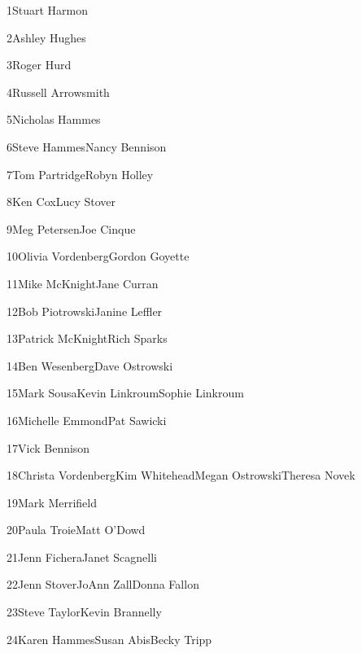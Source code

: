 \parbox[t]{4.75in}{1\hfil\break Stuart Harmon}\hfil\break\vskip 0.25in
\parbox[t]{4.75in}{2\hfil\break Ashley Hughes}\hfil\break\vskip 0.25in
\parbox[t]{4.75in}{3\hfil\break Roger Hurd}\hfil\break\vskip 0.25in
\parbox[t]{4.75in}{4\hfil\break Russell Arrowsmith}\hfil\break\vskip 0.25in
\parbox[t]{4.75in}{5\hfil\break Nicholas Hammes}\hfil\break\vskip 0.25in
\parbox[t]{4.75in}{6\hfil\break Steve Hammes\hfil\break Nancy Bennison}\hfil\break\vskip 0.25in
\parbox[t]{4.75in}{7\hfil\break Tom Partridge\hfil\break Robyn Holley}\hfil\break\vskip 0.25in
\parbox[t]{4.75in}{8\hfil\break Ken Cox\hfil\break Lucy Stover}\hfil\break\vskip 0.25in
\parbox[t]{4.75in}{9\hfil\break Meg Petersen\hfil\break Joe Cinque}\hfil\break\vskip 0.25in
\parbox[t]{4.75in}{10\hfil\break Olivia Vordenberg\hfil\break Gordon Goyette}\hfil\break\vskip 0.25in
\parbox[t]{4.75in}{11\hfil\break Mike McKnight\hfil\break Jane Curran}\hfil\break\vskip 0.25in
\parbox[t]{4.75in}{12\hfil\break Bob Piotrowski\hfil\break Janine Leffler}\hfil\break\vskip 0.25in
\parbox[t]{4.75in}{13\hfil\break Patrick McKnight\hfil\break Rich Sparks}\hfil\break\vskip 0.25in
\parbox[t]{4.75in}{14\hfil\break Ben Wesenberg\hfil\break Dave Ostrowski}\hfil\break\vskip 0.25in
\parbox[t]{4.75in}{15\hfil\break Mark Sousa\hfil\break Kevin Linkroum\hfil\break Sophie Linkroum}\hfil\break\vskip 0.25in
\parbox[t]{4.75in}{16\hfil\break Michelle Emmond\hfil\break Pat Sawicki}\hfil\break\vskip 0.25in
\parbox[t]{4.75in}{17\hfil\break Vick Bennison}\hfil\break\vskip 0.25in
\parbox[t]{4.75in}{18\hfil\break Christa Vordenberg\hfil\break Kim Whitehead\hfil\break Megan Ostrowski\hfil\break Theresa Novek}\hfil\break\vskip 0.25in
\parbox[t]{4.75in}{19\hfil\break Mark Merrifield}\hfil\break\vskip 0.25in
\parbox[t]{4.75in}{20\hfil\break Paula Troie\hfil\break Matt O'Dowd}\hfil\break\vskip 0.25in
\parbox[t]{4.75in}{21\hfil\break Jenn Fichera\hfil\break Janet Scagnelli}\hfil\break\vskip 0.25in
\parbox[t]{4.75in}{22\hfil\break Jenn Stover\hfil\break JoAnn Zall\hfil\break Donna Fallon}\hfil\break\vskip 0.25in
\parbox[t]{4.75in}{23\hfil\break Steve Taylor\hfil\break Kevin Brannelly}\hfil\break\vskip 0.25in
\parbox[t]{4.75in}{24\hfil\break Karen Hammes\hfil\break Susan Abis\hfil\break Becky Tripp}\hfil\break\vskip 0.25in
